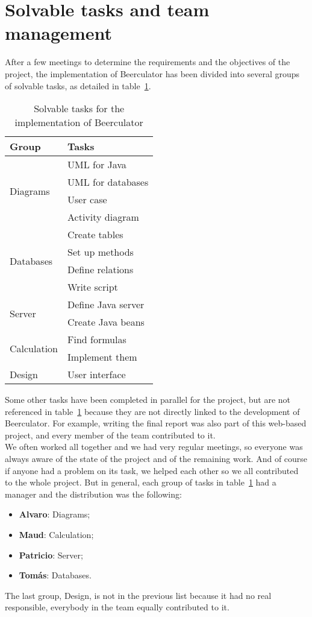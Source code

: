 \section{Solvable tasks and team management}
\label{sec:task}

After a few meetings to determine the requirements and the objectives of the project, the implementation of Beerculator has been divided into several groups of solvable tasks, as detailed in {\sc table}~\ref{table:tasks}.

\begin{table}[H]
\centering
\begin{tabular}{|l|l|}
  \hline
  \textbf{Group} & \textbf{Tasks}\\ \hline
  \multirow{4}{*}{Diagrams} & UML for Java \\
    & UML for databases \\
    & User case \\
    & Activity diagram\\ \hline
  \multirow{4}{*}{Databases} & Create tables \\
    & Set up methods \\
    & Define relations \\ 
    & Write script \\ \hline
  \multirow{2}{*}{Server} & Define Java server \\
    & Create Java beans \\
 \hline
    \multirow{2}{*}{Calculation} & Find formulas \\
    & Implement them \\ \hline
    Design & User interface\\
    \hline
\end{tabular}
\caption{Solvable tasks for the implementation of Beerculator}
\label{table:tasks}
\end{table}


Some other tasks have been completed in parallel for the project, but are not referenced in {\sc table}~\ref{table:tasks} because they are not directly linked to the development of Beerculator. For example, writing the final report was also part of this web-based project, and every member of the team contributed to it.\\


We often worked all together and we had very regular meetings, so everyone was always aware of the state of the project and of the remaining work. And of course if anyone had a problem on its task, we helped each other so we all contributed to the whole project. But in general, each group of tasks in {\sc table}~\ref{table:tasks} had a \guillemotleft{} manager \guillemotright{} and the distribution was the following:

\begin{itemize}[noitemsep]
\item {\bf Alvaro}: Diagrams;
\item {\bf Maud}: Calculation;
\item {\bf Patricio}: Server;
\item {\bf Tomás}: Databases.
\end{itemize}

The last group, Design, is not in the previous list because it had no real responsible, everybody in the team equally contributed to it.